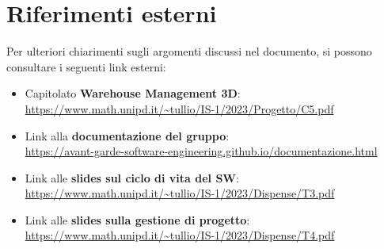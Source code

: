 \newpage


\newpage
\newpage
\section{Riferimenti esterni}\label{sec:riferimenti_esterni}
Per ulteriori chiarimenti sugli argomenti discussi nel documento, si possono consultare i seguenti link esterni:
\begin{itemize}
    \item Capitolato \textbf{Warehouse Management 3D}:\\
    \url{https://www.math.unipd.it/~tullio/IS-1/2023/Progetto/C5.pdf}
    \item Link alla \textbf{documentazione del gruppo}:\\
    \url{https://avant-garde-software-engineering.github.io/documentazione.html}
    \item Link alle \textbf{slides sul ciclo di vita del SW}:\\
    \url{https://www.math.unipd.it/~tullio/IS-1/2023/Dispense/T3.pdf}
    \item Link alle \textbf{slides sulla gestione di progetto}:\\
    \url{https://www.math.unipd.it/~tullio/IS-1/2023/Dispense/T4.pdf}   
\end{itemize}